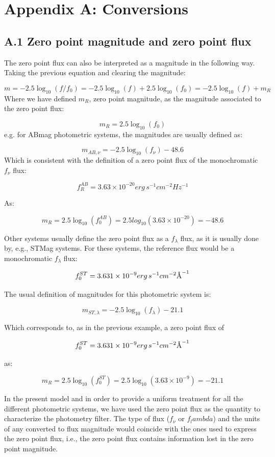 \documentclass[11pt,a4paper]{ivoa}
\newcommand{\angstrom}{\textup{\AA}}
\begin{document}
\section{Appendix A: Conversions}
\subsection{A.1 Zero point magnitude and zero point flux}
The zero point flux can also be interpreted as a magnitude in the following way. Taking the previous equation and clearing the magnitude:
\par
\[
m=-2.5\log_{10}(f/f_0 )=-2.5\log_{10}(f)+2.5\log_{10}(f_0 )=-2.5\log_{10} (f)+m_R 
\]
Where we have defined $m_R$, zero point magnitude, as the magnitude associated to the zero point flux:
\par
\[
m_R = 2.5\log_{10} (f_0 )
\]
e.g. for ABmag photometric systems, the magnitudes are usually defined as:
\par
\[
m_{AB,\nu } = -2.5\log_{10} (f_\nu ) - 48.6
\]
Which is consistent with the definition of a zero point flux of the monochromatic $f_\nu $ flux:
\par
\[
f_{R}^{AB}=3.63 \times 10^{-20} erg\, s^{-1} cm^{-2} Hz^{-1}
\]

As:
\par
\[
m_R = 2.5\log_{10} (f_{0}^{AB})=2.5 log_10(3.63\times 10^{-20})=-48.6
\]

Other systems usually define the zero point flux as a $f_\lambda $ flux, as it is usually done by, e.g., STMag systems. For these systems, the reference flux would be a monochromatic $f_\lambda $ flux:
\par
\[
f_0 ^{ST} = 3.631 \times 10^{-9} erg\, s^{-1} cm^{-2} \angstrom ^{-1}
\]

The usual definition of magnitudes for this photometric system is:
\par
\[
m_{ST,\lambda }=-2.5\log_{10} (f_\lambda )-21.1
\]

Which corresponds to, as in the previous example, a zero point flux of 
\par
\[
f_0 ^{ST}=3.631 \times 10^{-9} erg\, s^{-1} cm^{-2} \angstrom ^{-1}
\]

as:
\par
\[
m_R =2.5\log_{10} (f_0 ^{ST})=2.5\log_{10} (3.63\times 10^{-9})=-21.1
\]

In the present model and in order to provide a uniform treatment for all the different photometric systems, we have used the zero point flux as the quantity to characterize the photometry filter. The type of flux ($f_\nu $ or $f_lambda $) and the units of any converted to flux magnitude would coincide with the ones used to express the zero point flux, i.e., the zero point flux contains information lost in the zero point magnitude. 
\par
\end{document}
